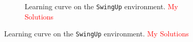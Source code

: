 \documentclass{article}
\begin{document}
\begin{figure}[h!]
\begin{subfigure}{0.45\textwidth}
          \caption{Learning curve on the \texttt{SwingUp} environment. \textcolor{red}{My Solutions}}
\end{subfigure}
\end{figure}
\end{document}
